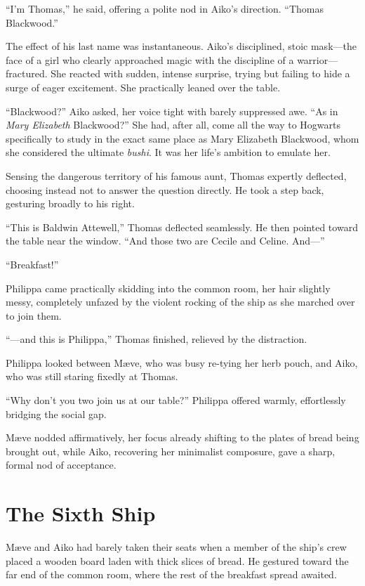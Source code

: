\enquote{I'm Thomas,} he said, offering a polite nod in Aiko's direction. \enquote{Thomas Blackwood.}

The effect of his last name was instantaneous. Aiko's disciplined, stoic mask---the face of a girl who clearly approached magic with the discipline of a warrior---fractured. She reacted with sudden, intense surprise, trying but failing to hide a surge of eager excitement. She practically leaned over the table.

\enquote{Blackwood?} Aiko asked, her voice tight with barely suppressed awe. \enquote{As in \textit{Mary Elizabeth} Blackwood?} She had, after all, come all the way to Hogwarts specifically to study in the exact same place as Mary Elizabeth Blackwood, whom she considered the ultimate \textit{bushi}. It was her life's ambition to emulate her.

Sensing the dangerous territory of his famous aunt, Thomas expertly deflected, choosing instead not to answer the question directly. He took a step back, gesturing broadly to his right.

\enquote{This is Baldwin Attewell,} Thomas deflected seamlessly. He then pointed toward the table near the window. \enquote{And those two are Cecile and Celine. And---}

\enquote{Breakfast!}

Philippa came practically skidding into the common room, her hair slightly messy, completely unfazed by the violent rocking of the ship as she marched over to join them.

\enquote{---and this is Philippa,} Thomas finished, relieved by the distraction.

Philippa looked between Mæve, who was busy re-tying her herb pouch, and Aiko, who was still staring fixedly at Thomas.

\enquote{Why don't you two join us at our table?} Philippa offered warmly, effortlessly bridging the social gap.

Mæve nodded affirmatively, her focus already shifting to the plates of bread being brought out, while Aiko, recovering her minimalist composure, gave a sharp, formal nod of acceptance.

\section*{The Sixth Ship}

Mæve and Aiko had barely taken their seats when a member of the ship's crew placed a wooden board laden with thick slices of bread. He gestured toward the far end of the common room, where the rest of the breakfast spread awaited.


